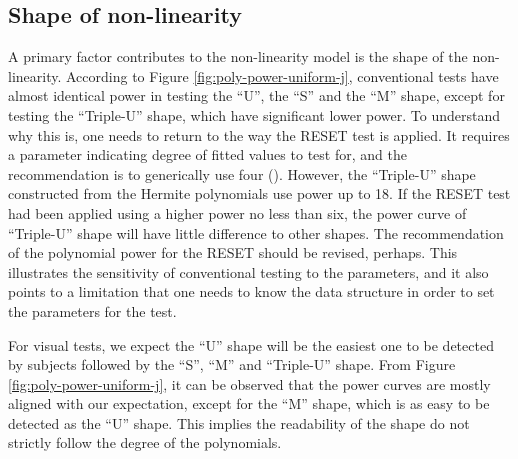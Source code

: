 \documentclass[]{interact}
\theoremstyle{plain}%
\theoremstyle{definition}
\theoremstyle{remark}
\begin{document}
\hypertarget{shape-of-non-linearity}{%
\subsection{Shape of non-linearity}\label{shape-of-non-linearity}}

A primary factor contributes to the non-linearity model is the shape of
the non-linearity. According to Figure \ref{fig:poly-power-uniform-j},
conventional tests have almost identical power in testing the ``U'', the
``S'' and the ``M'' shape, except for testing the ``Triple-U'' shape,
which have significant lower power. To understand why this is, one needs
to return to the way the RESET test is applied. It requires a parameter
indicating degree of fitted values to test for, and the recommendation
is to generically use four (\citet{ramsey_tests_1969}). However, the
``Triple-U'' shape constructed from the Hermite polynomials use power up
to 18. If the RESET test had been applied using a higher power no less
than six, the power curve of ``Triple-U'' shape will have little
difference to other shapes. The recommendation of the polynomial power
for the RESET should be revised, perhaps. This illustrates the
sensitivity of conventional testing to the parameters, and it also
points to a limitation that one needs to know the data structure in
order to set the parameters for the test.

For visual tests, we expect the ``U'' shape will be the easiest one to
be detected by subjects followed by the ``S'', ``M'' and ``Triple-U''
shape. From Figure \ref{fig:poly-power-uniform-j}, it can be observed
that the power curves are mostly aligned with our expectation, except
for the ``M'' shape, which is as easy to be detected as the ``U'' shape.
This implies the readability of the shape do not strictly follow the
degree of the polynomials.
\end{document}
